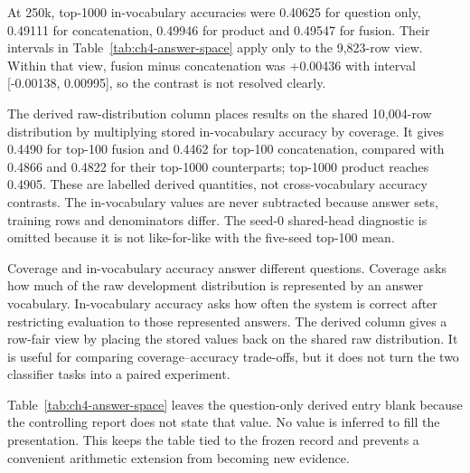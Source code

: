 At 250k, top-1000 in-vocabulary accuracies were 0.40625 for question only,
0.49111 for concatenation, 0.49946 for product and 0.49547 for fusion. Their
intervals in Table~\ref{tab:ch4-answer-space} apply only to the 9,823-row view.
Within that view, fusion minus concatenation was +0.00436 with interval
[-0.00138, 0.00995], so the contrast is not resolved clearly.

The derived raw-distribution column places results on the shared 10,004-row
distribution by multiplying stored in-vocabulary accuracy by coverage. It
gives 0.4490 for top-100 fusion and 0.4462 for top-100 concatenation, compared
with 0.4866 and 0.4822 for their top-1000 counterparts; top-1000 product reaches
0.4905. These are labelled derived quantities, not cross-vocabulary accuracy
contrasts. The in-vocabulary values are never subtracted because answer sets,
training rows and denominators differ. The seed-0 shared-head diagnostic is
omitted because it is not like-for-like with the five-seed top-100 mean.

Coverage and in-vocabulary accuracy answer different questions. Coverage asks
how much of the raw development distribution is represented by an answer
vocabulary. In-vocabulary accuracy asks how often the system is correct after
restricting evaluation to those represented answers. The derived column gives
a row-fair view by placing the stored values back on the shared raw
distribution. It is useful for comparing coverage--accuracy trade-offs, but it
does not turn the two classifier tasks into a paired experiment.

Table~\ref{tab:ch4-answer-space} leaves the question-only derived entry blank
because the controlling report does not state that value. No value is inferred
to fill the presentation. This keeps the table tied to the frozen record and
prevents a convenient arithmetic extension from becoming new evidence.

\begin{table}[tbp]
\centering
\caption[Answer-space size and development coverage.]{Top-100 and top-1000 results at 250k with distinct in-vocabulary denominators. The raw-distribution column copies the E3 report's derived values on the shared 10,004-row distribution. In-vocabulary accuracies are never differenced across answer spaces.}
\label{tab:ch4-answer-space}
\begingroup\scriptsize\setlength{\tabcolsep}{0.8pt}
\renewenvironment{longtable}[1]{\begin{tabular}{|p{0.08\textwidth}|p{0.10\textwidth}|p{0.105\textwidth}|p{0.13\textwidth}|p{0.18\textwidth}|p{0.08\textwidth}|p{0.16\textwidth}|}}{\end{tabular}}
\let\endhead\relax\renewcommand{\_}{\textunderscore\allowbreak}

\endgroup
\end{table}


